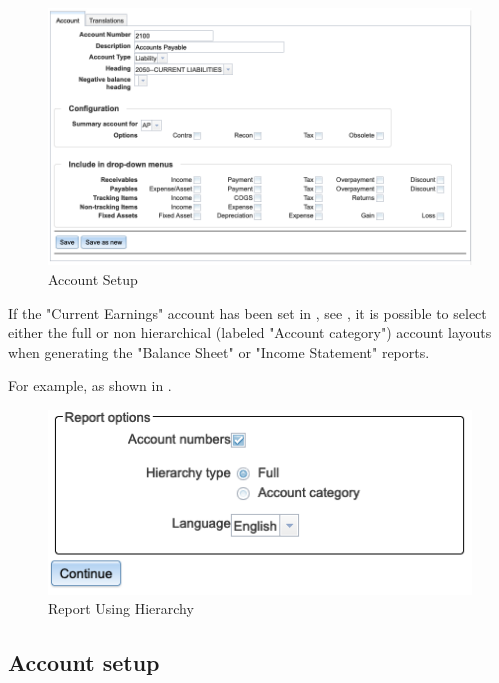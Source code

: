 \begin{figure}[H]
    \centering
    \includegraphics[width=\linewidth]{images/gl-coa.png}
    \caption{Account Setup}
    \label{fig:coa-account-setup}
\end{figure}

If the "Current Earnings" account has been set in , see , it is possible to select either the full or non hierarchical (labeled "Account category") account layouts when generating the "Balance Sheet" or "Income Statement" reports.

For example,  as shown in .

\begin{figure}[H]
\centering
\includegraphics[width=\graphicswidth]{images/reports-select-hierarchy.png}
\caption{Report Using Hierarchy}
\label{fig:config-report-hierarchy}
\end{figure}

\subsection{Account setup}
\label{sec-coa-account-setup}

